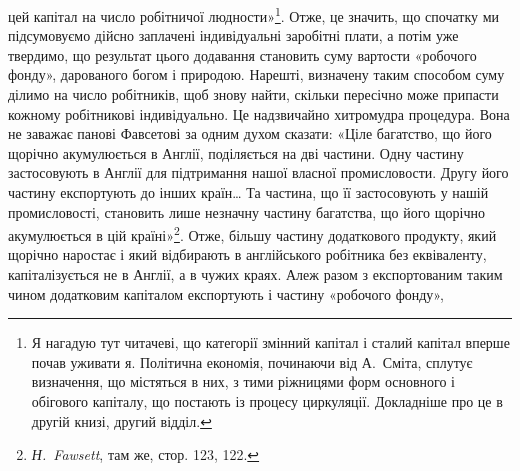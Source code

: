 \parcont{}  %
цей капітал на число робітничої людности»\footnote{
Я нагадую тут читачеві, що категорії змінний капітал і сталий
капітал вперше почав уживати я. Політична економія, починаючи від
А.~Сміта, сплутує визначення, що містяться в них, з тими ріжницями
форм основного і обігового капіталу, що постають із процесу циркуляції.
Докладніше про це в другій книзі, другий відділ.
}. Отже, це значить,
що спочатку ми підсумовуємо дійсно заплачені індивідуальні
заробітні плати, а потім уже твердимо, що результат цього додавання
становить суму вартости «робочого фонду», дарованого
богом і природою. Нарешті, визначену таким способом суму
ділимо на число робітників, щоб знову найти, скільки пересічно
може припасти кожному робітникові індивідуально. Це надзвичайно
хитромудра процедура. Вона не заважає панові Фавсетові
за одним духом сказати: «Ціле багатство, що його щорічно
акумулюється в Англії, поділяється на дві частини. Одну
частину застосовують в Англії для підтримання нашої власної
промисловости. Другу його частину експортують до інших
країн\dots{} Та частина, що її застосовують у нашій промисловості,
становить лише незначну частину багатства, що його щорічно
акумулюється в цій країні»\footnote{
\emph{Н.~Fawsett}, там же, стор. 123, 122.
}. Отже, більшу частину додаткового
продукту, який щорічно наростає і який відбирають в англійського
робітника без еквіваленту, капіталізується не в Англії,
а в чужих краях. Алеж разом з експортованим таким чином
додатковим капіталом експортують і частину «робочого фонду»,
